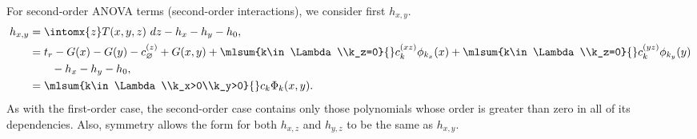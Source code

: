 For second-order ANOVA terms (second-order interactions), we consider first $h_{x,y}$.
\begin{align}
  h_{x,y} &= \intomx{z} T(x,y,z)\ dz - h_x - h_y - h_0,\\ \nonumber
    &= t_r - G(x) - G(y) - c^{(z)}_\varnothing + G(x,y) + \mlsum{k\in\Lambda\\k_z=0}{} c^{(xz)}_k\phi_{k_x}(x)
    + \mlsum{k\in\Lambda\\k_z=0}{} c^{(yz)}_k\phi_{k_y}(y) \\ \nonumber 
    & \hspace{20pt} - h_x - h_y - h_0, \\ \nonumber
  &= \mlsum{k\in\Lambda\\k_x>0\\k_y>0}{} c_k \Phi_k(x,y).
\end{align}
As with the first-order case, the second-order case contains only those polynomials whose order is greater than zero in
all of its dependencies.  Also, symmetry allows the form for both $h_{x,z}$ and $h_{y,z}$ to be the same as $h_{x,y}$.

